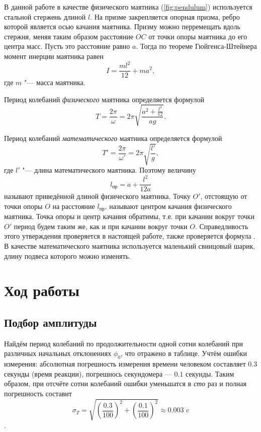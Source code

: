         В данной работе в качестве физического маятника (\ref{fig:pendulum}) используется стальной стержень длиной $l$. На призме закрепляется опорная призма, ребро которой является осью качания маятника. Призму можно перремещать вдоль стержня, меняя таким образом расстояние $OC$ от точки опоры маятника до его центра масс. Пусть это расстояние равно $a$. Тогда по теореме Гюйгенса-Штейнера момент инерции маятника равен
        \begin{equation}
            I = \frac{ml^2}{12} + ma^2,
        \end{equation}
        где $m$ "--- масса маятника.

        Период колебаний \emph{физического} маятника определяется формулой
        \begin{equation}
            \label{eq:period}
            T = \frac{2\pi}{\omega} = 2\pi\sqrt{\frac{a^2+\frac{l^2}{12}}{ag}}.
        \end{equation}

        Период колебаний \emph{математического} маятника определяется формулой
        \begin{equation}
            T' = \frac{2\pi}{\omega'} = 2\pi\sqrt{\frac{l'}{g}},
        \end{equation}
        где $l'$ "--- длина математического маятника. Поэтому величину
        \begin{equation}
            l_\text{пр} = a + \frac{l^2}{12a}
            \label{eq:length}
        \end{equation}
        называют приведённой длиной физического маятника. Точку $O'$, отстоящую от точки опоры $O$ на расстояние $l_\text{пр}$, называют центром качания физического маятника. Точка опоры и центр качания обратимы, т.е. при качании вокруг точки $O'$ период будем таким же, как и при качании вокруг точки $O$.
        Справедливость этого утверждения проверяется в настоящей работе, также проверяется формула . В качестве математического маятника используется маленький свинцовый шарик, длину подвеса которого можно изменять.

    \section{Ход работы}
        \subsection{Подбор амплитуды}    
            Найдём период колебаний по продолжительности одной сотни колебаний при различных начальных отклонениях $\phi_0$, что отражено в таблице. Учтём ошибки измерения: абсолютная погрешность измерения времени человеком составляет $0.3$ секунды (время реакции), погрешнось секундомера --- $0.1$ секунды. Таким образом, при отсчёте сотни колебаний ошибки уменьшатся в \emph{сто} раз и полная погрешность составит
            \[\sigma_T = \sqrt{\left(\frac{0.3}{100}\right)^2 + \left(\frac{0.1}{100}\right)^2} \approx 0.003\text{ c}\].

